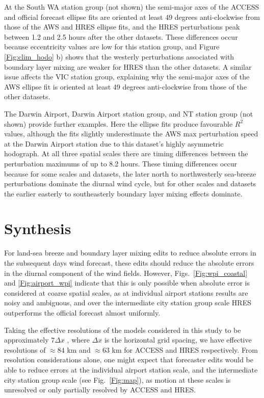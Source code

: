 \documentclass{ametsoc}
\begin{document}
At the South WA station group (not shown) the semi-major axes of the ACCESS and official forecast ellipse fits are oriented at least 49 degrees anti-clockwise from those of the AWS and HRES ellipse fits, and the HRES perturbations peak between 1.2 and 2.5 hours after the other datasets. These differences occur because eccentricity values are low for this station group, and Figure \ref{Fig:clim_hodo} b) shows that the westerly perturbations associated with boundary layer mixing are weaker for HRES than the other datasets. A similar issue affects the VIC station group, explaining why the semi-major axes of the AWS ellipse fit is oriented at least 49 degrees anti-clockwise from those of the other datasets. 

The Darwin Airport, Darwin Airport station group, and NT station group (not shown) provide further examples. Here the ellipse fits produce favourable $R^2$ values, although the fits slightly underestimate the AWS max perturbation speed at the Darwin Airport station due to this dataset's highly asymmetric hodograph. At all three spatial scales there are timing differences between the perturbation maximums of up to 8.2 hours. These timing differences occur because for some scales and datasets, the later north to northwesterly sea-breeze perturbations dominate the diurnal wind cycle, but for other scales and datasets the earlier easterly to southeasterly boundary layer mixing effects dominate.

\section{Synthesis}
\label{Sec:Discussion}
For land-sea breeze and boundary layer mixing edits to reduce absolute errors in the subsequent days wind forecast, these edits should reduce the absolute errors in the diurnal component of the wind fields. However, Figs.~\ref{Fig:wpi_coastal} and \ref{Fig:airport_wpi} indicate that this is only possible when absolute error is considered at coarse spatial scales, as at individual airport stations results are noisy and ambiguous, and over the intermediate city station group scale HRES outperforms the official forecast almost uniformly.  

Taking the effective resolutions of the models considered in this study to be approximately $7\Delta x$ \citep[e.g.][]{skamarock04, abdalla13}, where $\Delta x$ is the horizontal grid spacing, we have effective resolutions of $\approx 84$ km and $\approx 63$ km for ACCESS and HRES respectively. From resolution considerations alone, one might expect that forecaster edits would be able to reduce errors at the individual airport station scale, and the intermediate city station group scale (see Fig.~\ref{Fig:map}), as motion at these scales is unresolved or only partially resolved by ACCESS and HRES. 
\end{document}
